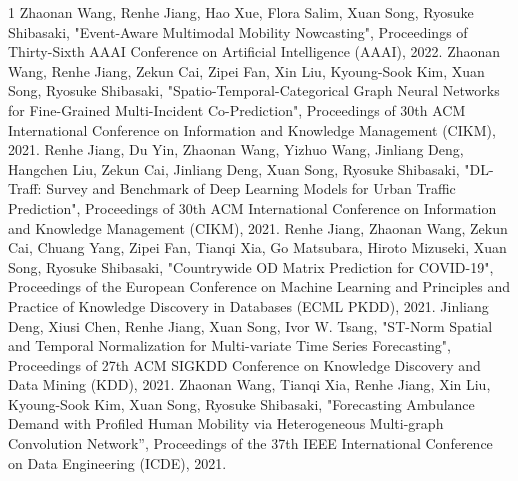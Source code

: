 \begin{査読付}{1}
Zhaonan Wang, Renhe Jiang, Hao Xue, Flora Salim, Xuan Song, Ryosuke Shibasaki, "Event-Aware Multimodal Mobility Nowcasting", Proceedings of Thirty-Sixth AAAI Conference on Artificial Intelligence (AAAI), 2022.
Zhaonan Wang, Renhe Jiang, Zekun Cai, Zipei Fan, Xin Liu, Kyoung-Sook Kim, Xuan Song, Ryosuke Shibasaki, "Spatio-Temporal-Categorical Graph Neural Networks for Fine-Grained Multi-Incident Co-Prediction", Proceedings of 30th ACM International Conference on Information and Knowledge Management (CIKM), 2021.
Renhe Jiang, Du Yin, Zhaonan Wang, Yizhuo Wang, Jinliang Deng, Hangchen Liu, Zekun Cai, Jinliang Deng, Xuan Song, Ryosuke Shibasaki, "DL-Traff: Survey and Benchmark of Deep Learning Models for Urban Traffic Prediction", Proceedings of 30th ACM International Conference on Information and Knowledge Management (CIKM), 2021.
Renhe Jiang, Zhaonan Wang, Zekun Cai, Chuang Yang, Zipei Fan, Tianqi Xia, Go Matsubara, Hiroto Mizuseki, Xuan Song, Ryosuke Shibasaki, "Countrywide OD Matrix Prediction for COVID-19", Proceedings of the European Conference on Machine Learning and Principles and Practice of Knowledge Discovery in Databases (ECML PKDD), 2021. 
Jinliang Deng, Xiusi Chen, Renhe Jiang, Xuan Song, Ivor W. Tsang, "ST-Norm Spatial and Temporal Normalization for Multi-variate Time Series Forecasting", Proceedings of 27th ACM SIGKDD Conference on Knowledge Discovery and Data Mining (KDD), 2021.
Zhaonan Wang, Tianqi Xia, Renhe Jiang, Xin Liu, Kyoung-Sook Kim, Xuan Song, Ryosuke Shibasaki, "Forecasting Ambulance Demand with Profiled Human Mobility via Heterogeneous Multi-graph Convolution Network”, Proceedings of the 37th IEEE International Conference on Data Engineering (ICDE), 2021. 
\end{査読付}

